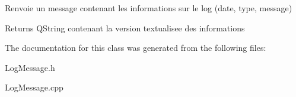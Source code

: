 \-Renvoie un message contenant les informations sur le log (date, type, message) 

\begin{DoxyReturn}{\-Returns}
\-Q\-String contenant la version textualisee des informations 
\end{DoxyReturn}


\-The documentation for this class was generated from the following files\-:\begin{DoxyCompactItemize}
\item 
\-Log\-Message.\-h\item 
\-Log\-Message.\-cpp\end{DoxyCompactItemize}
